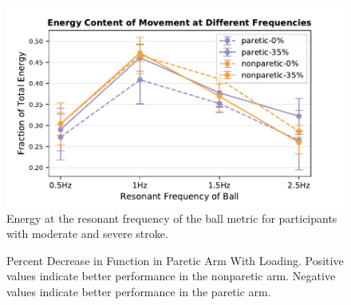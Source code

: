 \documentclass{article}
\begin{document}
\begin{figure}[!ht]
     \centering
     \includegraphics[width=0.49\linewidth]{Plots/e_at_res_raw_m.pdf}
	\caption{Energy at the resonant frequency of the ball metric for participants with moderate and severe stroke.}
\end{figure}

\begin{figure}[!ht]
     \centering
     \hfill
	\caption{Percent Decrease in Function in Paretic Arm With Loading. Positive values indicate better performance in the nonparetic arm. Negative values indicate better performance in the paretic arm. }
\end{figure}
\end{document}
